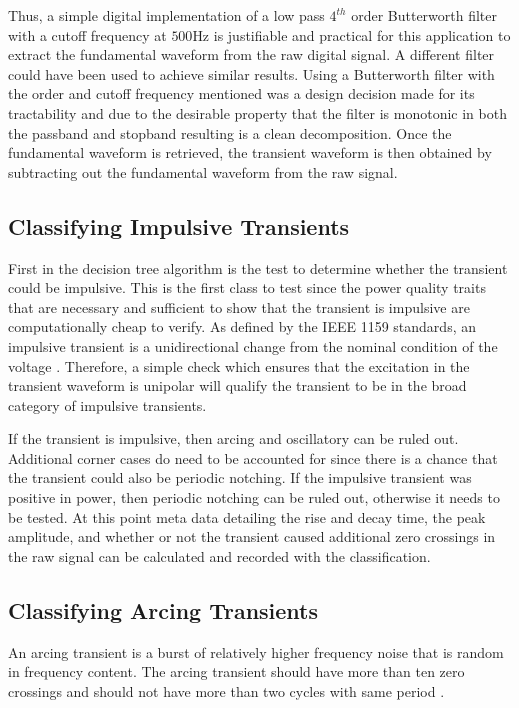 \documentclass[10pt, conference, compsocconf]{IEEEtran}
\begin{document}
Thus, a simple digital implementation of a low pass $4^{th}$ order Butterworth filter with a cutoff frequency at $500$Hz is justifiable and practical for this application to extract the fundamental waveform from the raw digital signal. A different filter could have been used to achieve similar results. Using a Butterworth filter with the order and cutoff frequency mentioned was a design decision made for its tractability and due to the desirable property that the filter is monotonic in both the passband and stopband resulting is a clean decomposition. Once the fundamental waveform is retrieved, the transient waveform is then obtained by subtracting out the fundamental waveform from the raw signal.

\subsection{Classifying Impulsive Transients}

First in the decision tree algorithm is the test to determine whether the transient could be impulsive. This is the first class to test since the power quality traits that are necessary and sufficient to show that the transient is impulsive are computationally cheap to verify. As defined by the IEEE 1159 standards, an impulsive transient is a unidirectional change from the nominal condition of the voltage \cite{IEEE:2018:1159D3}. Therefore, a simple check which ensures that the excitation in the transient waveform is unipolar will qualify the transient to be in the broad category of impulsive transients.

If the transient is impulsive, then arcing and oscillatory can be ruled out. Additional corner cases do need to be accounted for since there is a chance that the transient could also be periodic notching. If the impulsive transient was positive in power, then periodic notching can be ruled out, otherwise it needs to be tested. At this point meta data detailing the rise and decay time, the peak amplitude, and whether or not the transient caused additional zero crossings in the raw signal can be calculated and recorded with the classification.

\subsection{Classifying Arcing Transients}

An arcing transient is a burst of relatively higher frequency noise that is random in frequency content. The arcing transient should have more than ten zero crossings and should not have more than two cycles with same period \cite{IEEE:2018:1159D3}.
\end{document}
